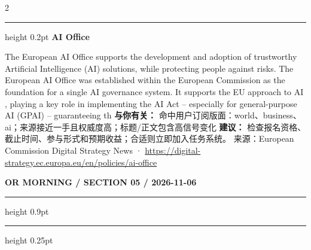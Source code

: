 \documentclass[10.5pt]{ctexart}
\begin{document}
\begin{multicols}{2}
\vspace{2mm}
\hrule height 0.2pt
\vspace{2mm}
{\large\bfseries AI Office}\par
The European AI Office supports the development and adoption of trustworthy Artificial Intelligence (AI) solutions, while protecting people against risks. The European AI Office was established within the European Commission as the foundation for a single AI governance system. It supports the EU approach to AI , playing a key role in implementing the AI Act – especially for general-purpose AI (GPAI) – guaranteeing th
\textbf{与你有关：} 命中用户订阅版面：world、business、ai；来源接近一手且权威度高；标题/正文包含高信号变化
\textbf{建议：} 检查报名资格、截止时间、参与形式和预期收益；合适则立即加入任务系统。
{\footnotesize\color{ormuted} 来源：European Commission Digital Strategy News · \url{https://digital-strategy.ec.europa.eu/en/policies/ai-office}}
\end{multicols}
\newpage
{\small\bfseries OR MORNING / SECTION 05 / 2026-11-06}
\vspace{2mm}
\hrule height 0.9pt
\vspace{1.5mm}
\hrule height 0.25pt
\vspace{4mm}
\end{document}

